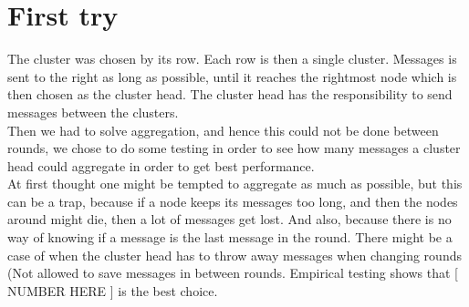 \documentclass{article}
\begin{document}
  \section{First try}
   The cluster was chosen by its row. Each row is then a single cluster. Messages
   is sent to the right as long as possible, until it reaches the rightmost
   node which is then chosen as the cluster head. The cluster head has the
   responsibility to send messages between the clusters.\\
   Then we had to solve aggregation, and hence this could not be done between
   rounds, we chose to do some testing in order to see how many messages a cluster
   head could aggregate in order to get best performance.\\
   At first thought one might be tempted to aggregate as much as possible, but
   this can be a trap, because if a node keeps its messages too long, and then
   the nodes around might die, then a lot of messages get lost. And also, because
   there is no way of knowing if a message is the last message in the round. There might be
   a case of when the cluster head has to throw away messages when changing
   rounds (Not allowed to save messages in between rounds. Empirical testing
   shows that [ NUMBER HERE ] is the best choice.
     
\end{document}
